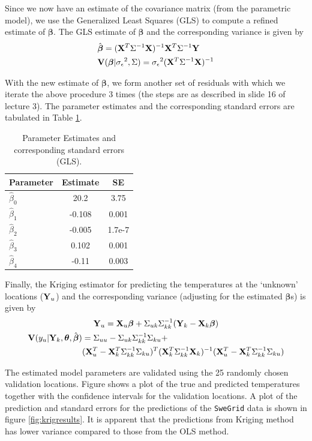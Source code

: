 \documentclass[a4paper,10pt]{article}
\def\bY{{\bf Y}}
\def\bX{{\bf X}}
\def\bV{{\bf V}}
\def\bbeta{{\boldsymbol \beta}}
\def\btheta{{\boldsymbol \theta}}
\def\sigmaeps{{\sigma_{\epsilon}}}
\begin{document}
Since we now have an estimate of the covariance matrix (from the parametric model), we use the Generalized Least Squares (GLS) to compute a refined estimate of $\bbeta$. The GLS estimate of $\bbeta$ and the corresponding variance is given by
\begin{align*}
& \hat \bbeta = (\bX^T \Sigma^{-1} \bX)^{-1} \bX^T \Sigma^{-1} \bY \\
& \bV(\bbeta | \sigmaeps^2, \Sigma) = \sigmaeps^2 (\bX^T \Sigma^{-1} \bX)^{-1}
\end{align*}

With the new estimate of $\bbeta$, we form another set of residuals with which we iterate the above procedure 3 times (the steps are as described in slide 16 of lecture 3). The parameter estimates and the corresponding standard errors are tabulated in Table \ref{tab:glsest}.
\begin{table}[ht]
\centering
\begin{tabular}{lcc}
\hline
{\bf Parameter} & {\bf Estimate} & {\bf SE }\\
\hline
$\hat \beta_0$ & 20.2 & 3.75 \\
$\hat \beta_1$ & -0.108 & 0.001\\
$\hat \beta_2$ & -0.005 & 1.7e-7 \\
$\hat \beta_3$ & 0.102 & 0.001\\
$\hat \beta_4$ & -0.11 & 0.003\\
\hline
\end{tabular}
\caption{Parameter Estimates and corresponding standard errors (GLS).}
\label{tab:glsest}
\end{table}

Finally, the Kriging estimator for predicting the temperatures at the `unknown' locations ($\bY_u$) and the corresponding variance (adjusting for the estimated $\bbeta$s) is given by
\begin{gather*}
\bY_u = \bX_u \bbeta + \Sigma_{uk} \Sigma_{kk}^{-1} (\bY_k - \bX_k \bbeta) \\
\begin{split}
\bV(y_u| \bY_k, \btheta, \hat \bbeta) &= \Sigma_{uu} -  \Sigma_{uk} \Sigma_{kk}^{-1}\Sigma_{ku} + \\
&(\bX_u^T - \bX_k^T \Sigma_{kk}^{-1}\Sigma_{ku})^T ( \bX_k^T \Sigma_{kk}^{-1} \bX_k)^{-1} (\bX_u^T - \bX_k^T \Sigma_{kk}^{-1}\Sigma_{ku})
\end{split}
\end{gather*}

The estimated model parameters are validated using the 25 randomly chosen validation locations. Figure shows a plot of the true and predicted temperatures together with the confidence intervals for the validation locations. A plot of the prediction and standard errors for the predictions of the {\texttt{SweGrid}} data is shown in figure \ref{fig:krigresults}. It is apparent that the predictions from Kriging method has lower variance compared to those from the OLS method.
\end{document}
